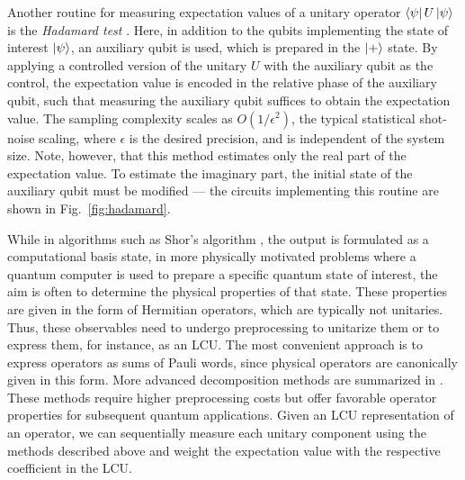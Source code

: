 \documentclass[../main.tex]{subfiles}
\begin{document}
Another routine for measuring expectation values of a unitary operator $\bra{\psi} U \ket{\psi}$ is the \textit{Hadamard test} \cite{nielsen2010quantum, tilly2022variational}. Here, in addition to the qubits implementing the state of interest $\ket{\psi}$, an auxiliary qubit is used, which is prepared in the $\ket{+}$ state. By applying a controlled version of the unitary $U$ with the auxiliary qubit as the control, the expectation value is encoded in the relative phase of the auxiliary qubit, such that measuring the auxiliary qubit suffices to obtain the expectation value. The sampling complexity scales as $O(1/\epsilon^2)$, the typical statistical shot-noise scaling, where $\epsilon$ is the desired precision, and is independent of the system size. Note, however, that this method estimates only the real part of the expectation value. To estimate the imaginary part, the initial state of the auxiliary qubit must be modified --- the circuits implementing this routine are shown in Fig.~\ref{fig:hadamard}.

While in algorithms such as Shor's algorithm \cite{shor1994algorithms}, the output is formulated as a computational basis state, in more physically motivated problems where a quantum computer is used to prepare a specific quantum state of interest, the aim is often to determine the physical properties of that state. These properties are given in the form of Hermitian operators, which are typically not unitaries. Thus, these observables need to undergo preprocessing to unitarize them or to express them, for instance, as an \ac{LCU}. The most convenient approach is to express operators as sums of Pauli words, since physical operators are canonically given in this form. More advanced decomposition methods are summarized in \cite{loaiza2023reducing}. These methods require higher preprocessing costs but offer favorable operator properties for subsequent quantum applications. Given an LCU representation of an operator, we can sequentially measure each unitary component using the methods described above and weight the expectation value with the respective coefficient in the LCU.
\end{document}
